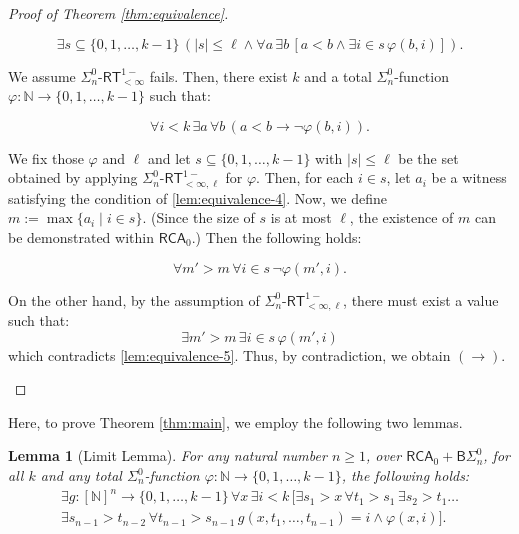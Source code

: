 \documentclass[10pt,reqno]{amsart}
\newtheorem{lemma}[theorem]{Lemma}
\numberwithin{equation}{section}
\begin{document}
\begin{proof}[Proof of Theorem \ref{thm:equivalence}]
\begin{enumerate}[label=(\roman*),topsep=0.5em,itemsep=0.5em]
\begin{equation}
\exists s \subseteq \{0,1,\dots,k-1\} \, (|s|\le\ell \land \forall a \, \exists b \, [a < b \land \exists i \in s \, \varphi(b,i)]).
\end{equation}


We assume $\Sigma_{n}^{0}\text{-}\mathsf{RT}_{<\infty}^{1-}$ fails. Then, there exist $k$ and a total $\Sigma_{n}^{0}$-function $\varphi\colon\mathbb{N}\to\{0,1,\dots,k-1\}$ such that:


\begin{equation}
\forall i < k \, \exists a \, \forall b \, (a < b \rightarrow \neg\varphi(b,i)). \label{lem:equivalence-4}
\end{equation}


We fix those $\varphi$ and $\ell$ and let $s \subseteq \{0,1,\dots,k-1\}$ with $|s|\le\ell$ be the set obtained by applying $\Sigma_{n}^{0}\text{-}\mathsf{RT}_{<\infty,\ell}^{1-}$ for $\varphi$.
Then, for each $i \in s$, let $a_i$ be a witness satisfying the condition of \eqref{lem:equivalence-4}. Now, we define $m:=\max\{a_i \mid i\in s\}$. (Since the size of $s$ is at most $\ell$, the existence of $m$ can be demonstrated within $\mathsf{RCA}_0$.)
Then the following holds:


\begin{equation}
\forall m' > m \, \forall i \in s \, \neg\varphi(m',i). \label{lem:equivalence-5}
\end{equation}


On the other hand, by the assumption of $\Sigma_{n}^{0}\text{-}\mathsf{RT}_{<\infty,\ell}^{1-}$, there must exist a value such that:
\[
\exists m' > m \, \exists i \in s \, \varphi(m',i)
\]
which contradicts \eqref{lem:equivalence-5}. Thus, by contradiction, we obtain $(\rightarrow)$.
\end{enumerate}
\end{proof}


Here, to prove Theorem \ref{thm:main}, we employ the following two lemmas.


\begin{lemma}[Limit Lemma]\label{lem:limit}
For any natural number $n\ge 1$, over $\mathsf{RCA}_0+\mathsf{B}\Sigma_{n}^{0}$, for all $k$ and any total $\Sigma_{n}^{0}$-function $\varphi\colon\mathbb{N}\to\{0,1,\dots,k-1\}$, the following holds:
\begin{multline}
\exists g\colon[\mathbb{N}]^{n}\to\{0,1,\dots,k-1\} \, \forall x \, \exists i < k \,
[\exists s_1 > x \, \forall t_1 > s_1 \, \exists s_2 > t_1 \dots \\ \exists s_{n-1} > t_{n-2} \, \forall t_{n-1} > s_{n-1} \, g(x,t_1,\dots,t_{n-1})=i \land \varphi(x,i)].
\end{multline}
\end{lemma}
\end{document}
